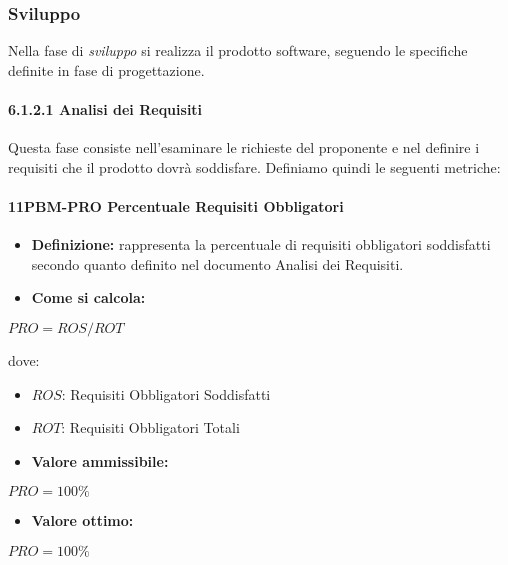 \subsubsection{Sviluppo}
Nella fase di \emph{sviluppo} si realizza il prodotto software, seguendo le specifiche definite in fase di progettazione.
\paragraph*{6.1.2.1 Analisi dei Requisiti}
Questa fase consiste nell'esaminare le richieste del proponente e nel definire i requisiti che il prodotto dovrà soddisfare. Definiamo quindi le seguenti metriche:

\paragraph*{11PBM-PRO Percentuale Requisiti Obbligatori}
\begin{itemize}
    \item \textbf{Definizione:} rappresenta la percentuale di requisiti obbligatori soddisfatti secondo quanto definito nel documento Analisi dei Requisiti.
    \item \textbf{Come si calcola:}
\end{itemize}
\begin{center}
   $PRO = ROS/ROT$ 
\end{center}
dove:
\begin{itemize}[label=$\rightarrow$]
    \item $ROS$: Requisiti Obbligatori Soddisfatti
    \item $ROT$: Requisiti Obbligatori Totali
\end{itemize}
\begin{itemize}
    \item \textbf{Valore ammissibile:}
\end{itemize}
\begin{center}
    $PRO = 100\%$
\end{center}
\begin{itemize}
    \item \textbf{Valore ottimo:}
\end{itemize}
\begin{center}
    $PRO = 100\%$
\end{center}

